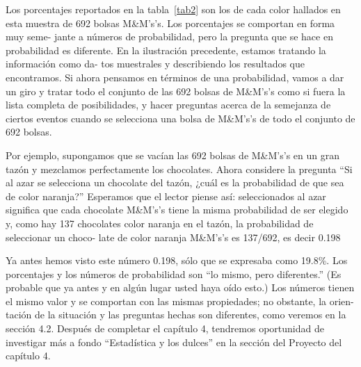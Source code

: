 \documentclass[10pt,twoside]{article}
\begin{document}
Los porcentajes reportados en la tabla~\ref{tab2} son los de cada color hallados en esta
muestra de 692 bolsas M\&M's’s. Los porcentajes se comportan en forma muy seme-
jante a números de probabilidad, pero la pregunta que se hace en probabilidad es
diferente. En la ilustración precedente, estamos tratando la información como da-
tos muestrales y describiendo los resultados que encontramos. Si ahora pensamos
en términos de una probabilidad, vamos a dar un giro y tratar todo el conjunto de
las 692 bolsas de M\&M's’s como si fuera la lista completa de posibilidades, y hacer
preguntas acerca de la semejanza de ciertos eventos cuando se selecciona una bolsa
de M\&M's’s de todo el conjunto de 692 bolsas.

Por ejemplo, supongamos que se vacían las 692 bolsas de M\&M's’s en un gran
tazón y mezclamos perfectamente los chocolates. Ahora considere la pregunta “Si
al azar se selecciona un chocolate del tazón, ¿cuál es la probabilidad de que sea de
color naranja?” Esperamos que el lector piense así: seleccionados al azar significa
que cada chocolate M\&M's’s tiene la misma probabilidad de ser elegido y, como hay
137 chocolates color naranja en el tazón, la probabilidad de seleccionar un choco-
late de color naranja M\&M's’s es 137/692, es decir 0.198

Ya antes hemos visto este número 0.198, sólo que se expresaba como 19.8\%.
Los porcentajes y los números de probabilidad son “lo mismo, pero diferentes.” (Es
probable que ya antes y en algún lugar usted haya oído esto.) Los números tienen
el mismo valor y se comportan con las mismas propiedades; no obstante, la orien-
tación de la situación y las preguntas hechas son diferentes, como veremos en la
sección 4.2.
Después de completar el capítulo 4, tendremos oportunidad de investigar más a
fondo “Estadística y los dulces” en la sección del Proyecto del capítulo 4.
\end{document}
